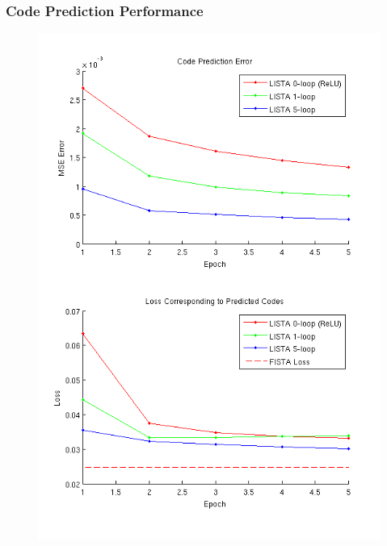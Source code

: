 \documentclass{beamer}
\begin{document}
\begin{frame} 
\frametitle{Code Prediction Performance}  
\begin{figure} 
\includegraphics[scale=0.35]{./figures/code_pred.png}
\end{figure} 
\end{frame} 
\end{document}
